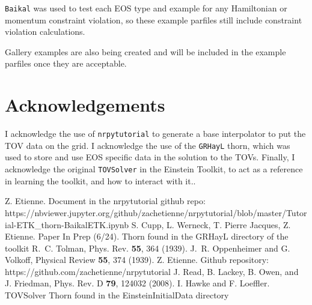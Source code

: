 {\tt Baikal} was used to test each EOS type and example for any Hamiltonian or momentum constraint violation, so these example parfiles still include constraint violation calculations.

Gallery examples are also being created and will be included in the example parfiles once they are acceptable.

\section{Acknowledgements}

I acknowledge the use of {\tt nrpytutorial}\cite{NRpy} to generate a base interpolator to put the TOV data on the grid. I acknowledge the use of the {\tt GRHayL} thorn, which was used to store and use EOS specific data in the solution to the TOVs. Finally, I acknowledge the original {\tt TOVSolver} in the Einstein Toolkit, to act as a reference in learning the toolkit, and how to interact with it.\cite{Hawke}.

\begin{thebibliography}{9}
Z. Etienne. Document in the nrpytutorial github repo: https://nbviewer.jupyter.org/github/zachetienne/nrpytutorial/blob/master/Tutorial-ETK\_thorn-BaikalETK.ipynb
%
S. Cupp, L. Werneck, T. Pierre Jacques, Z. Etienne. Paper In Prep (6/24). Thorn found in the GRHayL directory of the toolkit
%
R.~C. Tolman, Phys. Rev. {\bf 55}, 364 (1939).
%
J.~R. Oppenheimer and G. Volkoff, Physical Review {\bf 55}, 374 (1939).
%
Z. Etienne. Github repository: https://github.com/zachetienne/nrpytutorial
%
J. Read, B. Lackey, B. Owen, and J. Friedman, Phys. Rev. D {\bf 79}, 124032 (2008).
%
I. Hawke and F. Loeffler. TOVSolver Thorn found in the EinsteinInitialData directory
%
\end{thebibliography}



